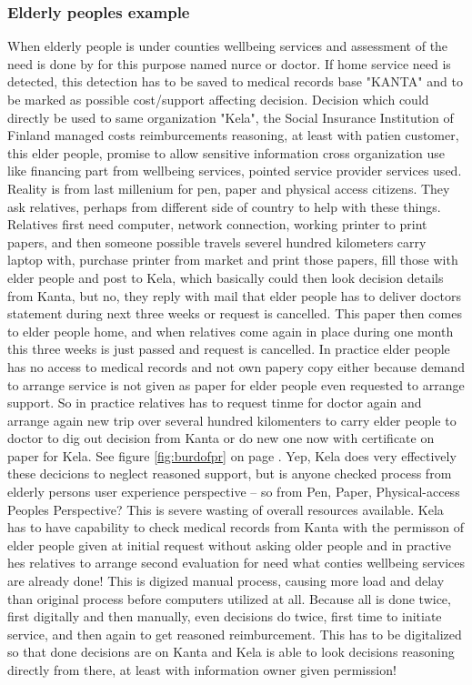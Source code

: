 \subsubsection{Elderly peoples example}
When elderly people is under counties wellbeing services
and assessment of the need is done by for this purpose named nurce or doctor.
If home service need is detected,
this detection has to be saved to medical records base "KANTA"
and to be marked as possible cost/support affecting decision.
Decision which could directly be used to same organization "Kela",
the Social Insurance Institution of Finland managed costs reimburcements reasoning,
at least with patien customer, this elder people,
promise to allow sensitive information cross organization use
like financing part from wellbeing services,
pointed service provider services used.
Reality is from last millenium for pen, paper and physical access citizens.
They ask relatives, perhaps from different side of country to help with these things.
Relatives first need computer, network connection, working printer to print papers,
and then someone possible travels severel hundred kilometers carry laptop with,
purchase printer from market and print those papers, fill those with elder people and post to Kela,
which basically could then look decision details from Kanta, but no,
they reply with mail that elder people has to deliver doctors statement during next three weeks or request is cancelled.
This paper then comes to elder people home,
and when relatives come again in place during one month this three weeks is just passed and request is cancelled.
In practice elder people has no access to medical records
and not own papery copy either because demand to arrange service is not given as paper for elder people even requested to arrange support.
So in practice relatives has to request tinme for doctor again and arrange again new trip over several hundred kilomenters to carry elder people to doctor to dig out decision from Kanta or do new one now with certificate on paper for Kela.
See figure \ref{fig:burdofpr} on page \pageref{fig:burdofpr}.
Yep, Kela does very effectively these decicions to neglect reasoned support,
but is anyone checked process from elderly persons user experience perspective --
so from Pen, Paper, Physical-access Peoples Perspective?
This is severe wasting of overall resources available\cite{ElakelaisetRynJanKoskimiesJaElakeliitonIreneVuorisalo}.
Kela has to have capability to check medical records from Kanta with the permisson of elder people given at initial request without asking older people and in practive hes relatives to arrange second evaluation for need what conties wellbeing services are already done!
This is digized manual process,
causing more load and delay than original process before computers utilized at all.
Because all is done twice, first digitally and then manually, even decisions do twice,
first time to initiate service, and then again to get reasoned reimburcement.
This has to be digitalized so that done decisions are on Kanta and Kela is able to look decisions reasoning directly from there,
at least with information owner given permission!

